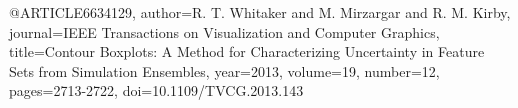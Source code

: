 @ARTICLE{6634129,
  author={R. T. {Whitaker} and M. {Mirzargar} and R. M. {Kirby}},
  journal={IEEE Transactions on Visualization and Computer Graphics}, 
  title={Contour Boxplots: A Method for Characterizing Uncertainty in Feature Sets from Simulation Ensembles}, 
  year={2013},
  volume={19},
  number={12},
  pages={2713-2722},
  doi={10.1109/TVCG.2013.143}}